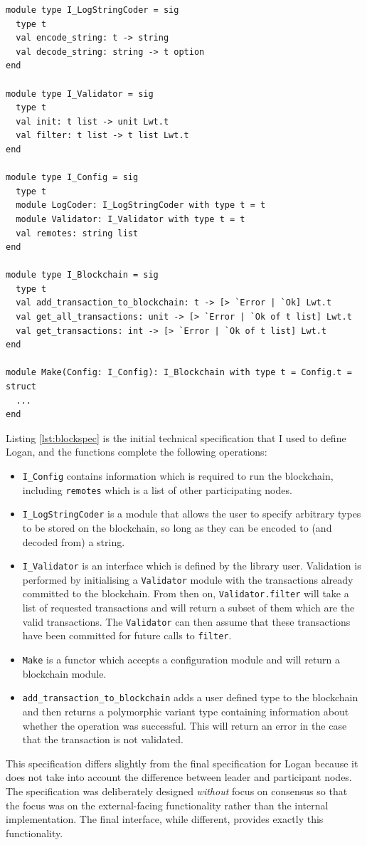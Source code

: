 \documentclass[12pt,a4paper,twoside,openright]{report}
\begin{document}
	\begin{lstlisting}[caption={Blockchain Specification},label={lst:blockspec},float,floatplacement=H]
module type I_LogStringCoder = sig
  type t
  val encode_string: t -> string
  val decode_string: string -> t option
end

module type I_Validator = sig 
  type t 
  val init: t list -> unit Lwt.t 
  val filter: t list -> t list Lwt.t
end

module type I_Config = sig
  type t
  module LogCoder: I_LogStringCoder with type t = t
  module Validator: I_Validator with type t = t
  val remotes: string list
end

module type I_Blockchain = sig
  type t
  val add_transaction_to_blockchain: t -> [> `Error | `Ok] Lwt.t
  val get_all_transactions: unit -> [> `Error | `Ok of t list] Lwt.t
  val get_transactions: int -> [> `Error | `Ok of t list] Lwt.t
end

module Make(Config: I_Config): I_Blockchain with type t = Config.t = struct 
  ...
end
	\end{lstlisting}
	Listing \ref{lst:blockspec} is the initial technical specification that I used to define Logan, and the functions complete the following operations:
	\begin{itemize}
		\item \texttt{I\_Config} contains information which is required to run the blockchain, including \texttt{remotes} which is a list of other participating nodes.
		\item \texttt{I\_LogStringCoder} is a module that allows the user to specify arbitrary types to be stored on the blockchain, so long as they can be encoded to (and decoded from) a string.
		\item \texttt{I\_Validator} is an interface which is defined by the library user. 
		Validation is performed by initialising a \texttt{Validator} module with the transactions already committed to the blockchain.
		From then on, \texttt{Validator.filter} will take a list of requested transactions and will return a subset of them which are the valid transactions.
		The \texttt{Validator} can then assume that these transactions have been committed for future calls to \texttt{filter}.
		\item \texttt{Make} is a functor which accepts a configuration module and will return a blockchain module.
		\item \texttt{add\_transaction\_to\_blockchain} adds a user defined type to the blockchain and then returns a polymorphic variant type containing information about whether the operation was successful. 
		This will return an error in the case that the transaction is not validated.
	\end{itemize} 
	This specification differs slightly from the final specification for Logan because it does not take into account the difference between leader and participant nodes.
	The specification was deliberately designed \textit{without} focus on consensus so that the focus was on the external-facing functionality rather than the internal implementation. 
	The final interface, while different, provides exactly this functionality.
\end{document}
